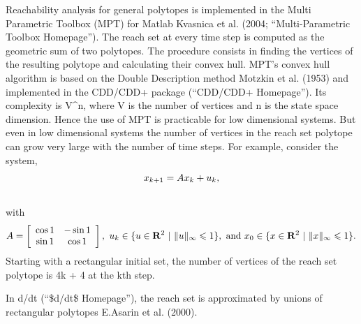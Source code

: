 \documentclass[letterpaper,10pt,english]{sphinxmanual}
\begin{document}
Reachability analysis for general polytopes is implemented in the Multi
Parametric Toolbox (MPT) for Matlab Kvasnica et al. (2004;
“Multi-Parametric Toolbox Homepage”). The reach set at every time step
is computed as the geometric sum of two polytopes. The procedure
consists in finding the vertices of the resulting polytope and
calculating their convex hull. MPT’s convex hull algorithm is based on
the Double Description method Motzkin et al. (1953) and implemented in
the CDD/CDD+ package (“CDD/CDD+ Homepage”). Its complexity is
V^n, where V is the number of vertices and n is
the state space dimension. Hence the use of MPT is practicable for low
dimensional systems. But even in low dimensional systems the number of
vertices in the reach set polytope can grow very large with the number
of time steps. For example, consider the system,
\begin{gather}
\begin{split}x_{k+1} = Ax_k + u_k ,\end{split}\notag\\\begin{split}\end{split}\notag
\end{gather}
with
\begin{gather}
\begin{split}A=\left[
\begin{array}{cc}
\cos 1 & -\sin 1\\
\sin 1 & \cos 1
\end{array}
\right],\ u_k \in \{u\in {\bf R}^2 ~|~ \|u\|_{\infty}\leqslant1\},\mbox{ and } x_0 \in \{x\in {\bf R}^2 ~|~ \|x\|_{\infty}\leqslant1\}.\end{split}\notag
\end{gather}
Starting with a rectangular initial set, the number of vertices of the
reach set polytope is 4k + 4 at the kth step.

In d/dt (“\$d/dt\$ Homepage”), the reach set is approximated by
unions of rectangular polytopes E.Asarin et al. (2000).
\end{document}
